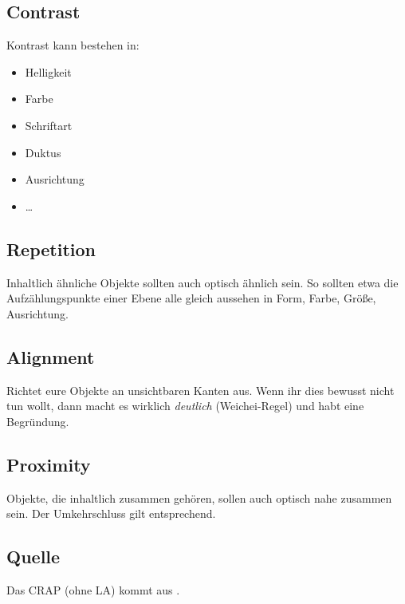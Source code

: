 \subsection{Contrast}
Kontrast kann bestehen in:
\begin{itemize}
  \item Helligkeit
  \item Farbe
  \item Schriftart
  \item Duktus
  \item Ausrichtung
  \item \ldots
\end{itemize}

\subsection{Repetition}
Inhaltlich ähnliche Objekte sollten auch optisch ähnlich sein. So sollten etwa die Aufzählungspunkte einer Ebene alle gleich aussehen in Form, Farbe, Größe, Ausrichtung.

\subsection{Alignment}
Richtet eure Objekte an unsichtbaren Kanten aus. Wenn ihr dies bewusst nicht tun wollt, dann macht es wirklich \emph{deutlich} (Weichei-Regel) und habt eine Begründung.

\subsection{Proximity}
Objekte, die inhaltlich zusammen gehören, sollen auch optisch nahe zusammen sein. Der Umkehrschluss gilt entsprechend.

\subsection{Quelle}
Das CRAP (ohne LA) kommt aus \cite{non-designer}.
